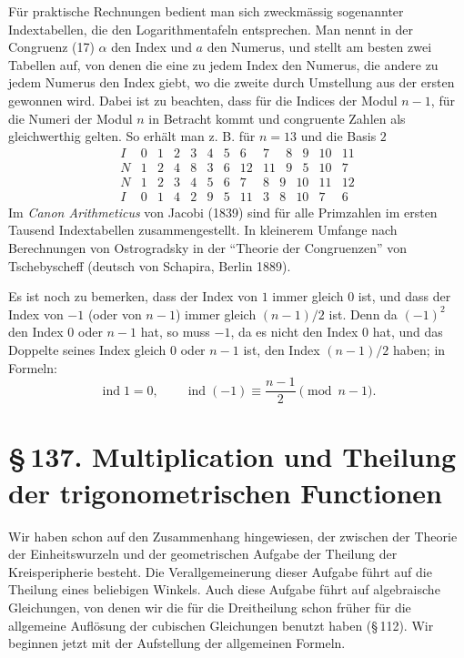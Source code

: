 \documentclass[11pt]{article}
\providecommand{\sect}[2]{\section*{\S\,#1. #2}}
\begin{document}
Für praktische Rechnungen bedient man sich zweckmässig sogenannter Indextabellen, die den Logarithmentafeln entsprechen. Man nennt in der Congruenz (17) $\alpha$ den Index und $a$ den Numerus, und stellt am besten zwei Tabellen auf, von denen die eine zu jedem Index den Numerus, die andere zu jedem Numerus den Index giebt, wo die zweite durch Umstellung aus der ersten gewonnen wird. Dabei ist zu beachten, dass für die Indices der Modul $n-1$, für die Numeri der Modul $n$ in Betracht kommt und congruente Zahlen als gleichwerthig gelten. So erhält man z. B. für $n=13$ und die Basis $2$
\[
\begin{array}{c|rrrrrrrrrrrr}
I&0&1&2&3&4&5&6&7&8&9&10&11\\\hline
N&1&2&4&8&3&6&12&11&9&5&10&7
\end{array}
\]
\[
\begin{array}{c|rrrrrrrrrrrr}
N&1&2&3&4&5&6&7&8&9&10&11&12\\\hline
I&0&1&4&2&9&5&11&3&8&10&7&6
\end{array}
\]
Im \emph{Canon Arithmeticus} von Jacobi (1839) sind für alle Primzahlen im ersten Tausend Indextabellen zusammengestellt. In kleinerem Umfange nach Berechnungen von Ostrogradsky in der ``Theorie der Congruenzen'' von Tschebyscheff (deutsch von Schapira, Berlin 1889).

Es ist noch zu bemerken, dass der Index von $1$ immer gleich $0$ ist, und dass der Index von $-1$ (oder von $n-1$) immer gleich $(n-1)/2$ ist. Denn da $(-1)^2$ den Index $0$ oder $n-1$ hat, so muss $-1$, da es nicht den Index $0$ hat, und das Doppelte seines Index gleich $0$ oder $n-1$ ist, den Index $(n-1)/2$ haben; in Formeln:
\[
\tag{21}       \operatorname{ind}1=0,
        \qquad \operatorname{ind}(-1)\equiv\frac{n-1}{2}\pmod{n-1}.
\]

\sect{137}{Multiplication und Theilung der trigonometrischen Functionen}

Wir haben schon auf den Zusammenhang hingewiesen, der zwischen der Theorie der Einheitswurzeln und der geometrischen Aufgabe der Theilung der Kreisperipherie besteht. Die Verallgemeinerung dieser Aufgabe führt auf die Theilung eines beliebigen Winkels. Auch diese Aufgabe führt auf algebraische Gleichungen, von denen wir die für die Dreitheilung schon früher für die allgemeine Auflösung der cubischen Gleichungen benutzt haben (\S\,112). Wir beginnen jetzt mit der Aufstellung der allgemeinen Formeln.
\end{document}
